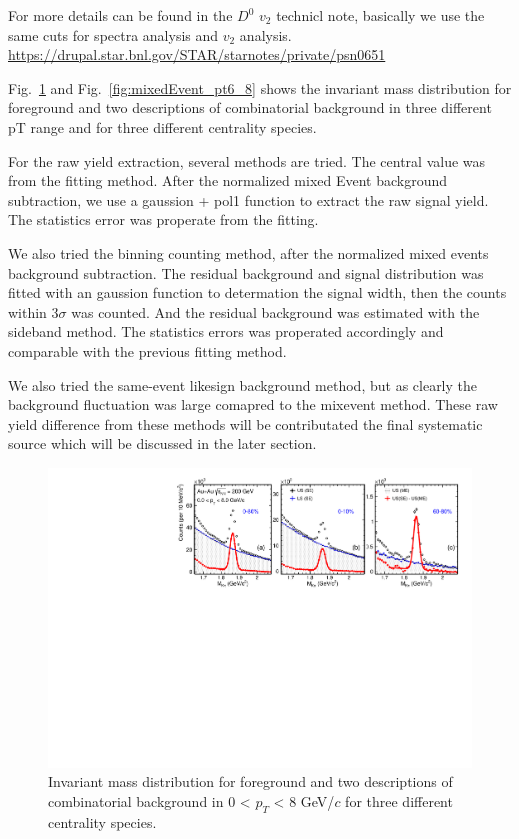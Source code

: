 For more details can be found in the $D^0$ $v_2$ technicl note, basically we use the same cuts for spectra analysis and $v_2$ analysis.
\url{https://drupal.star.bnl.gov/STAR/starnotes/private/psn0651}

Fig.~\ref{fig:mixedEvent_pt0_8} and Fig.~\ref{fig:mixedEvent_pt6_8} shows the invariant mass distribution for foreground and two descriptions of combinatorial background in three different pT range and for three different centrality species.

For the raw yield extraction, several methods are tried. The central value was from the fitting method. After the normalized mixed Event background subtraction, we use a gaussion + pol1 function to extract the raw signal yield. The statistics error was properate from the fitting. 

We also tried the binning counting method, after the normalized mixed events background subtraction. The residual background and signal distribution was fitted with an gaussion function to determation the signal width, then the counts within 3$\sigma$ was counted. And the residual background was estimated with the sideband method. The statistics errors was properated accordingly and comparable with the previous fitting method.

We also tried the same-event likesign background method, but as clearly the background fluctuation was large comapred to the mixevent method. These raw yield difference from these methods will be contributated the final systematic source which will be discussed in the later section.


\begin{figure}[htbp]
\centering
\includegraphics[keepaspectratio,width=1.0\textwidth]{figure/Run14_D0HFT/signal_0_8GeV.pdf}
\caption{Invariant mass distribution for foreground and two descriptions of combinatorial background in 0 < $p_T$ < 8 GeV/$c$ for three different centrality species.}
\label{fig:mixedEvent_pt0_8}
\end{figure}

